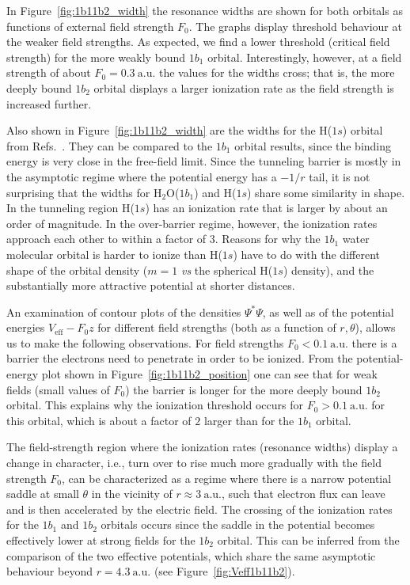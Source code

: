 In Figure~\ref{fig:1b11b2_width} the resonance widths are shown for
both orbitals as functions of external field strength $F_{0}$. The
graphs display threshold behaviour at the weaker field strengths. As
expected, we find a lower threshold (critical field strength) for the
more weakly bound $1b_{1}$ orbital. Interestingly, however, at a field
strength of about $F_{0} = 0.3\ \mathrm{a.u.}$ the values for the
widths cross; that is, the more deeply bound $1b_{2}$ orbital displays
a larger ionization rate as the field strength is increased further.

Also shown in Figure~\ref{fig:1b11b2_width} are the widths for the
H($1s$) orbital from Refs.~\cite{Telnov_1989,Kolosov_1987}. They can
be compared to the $1b_{1}$ orbital results, since the binding energy
is very close in the free-field limit. Since the tunneling barrier is
mostly in the asymptotic regime where the potential energy has a
$-1/r$ tail, it is not surprising that the widths for
H$_{2}$O($1b_{1}$) and H($1s$) share some similarity in shape. In the
tunneling region H($1s$) has an ionization rate that is larger by
about an order of magnitude. In the over-barrier regime, however, the
ionization rates approach each other to within a factor of 3. Reasons
for why the $1b_1$ water molecular orbital is harder to ionize than
H($1s$) have to do with the different shape of the orbital density
($m=1$ \emph{vs} the spherical H($1s$) density), and the substantially
more attractive potential at shorter distances.

An examination of contour plots of the densities $\Psi^{*}\Psi$, as
well as of the potential energies $V_{\mathrm{eff}} - F_{0}z$ for
different field strengths (both as a function of $r,\theta$), allows
us to make the following observations. For field strengths $F_{0} <
0.1\ \mathrm{a.u.}$ there is a barrier the electrons need to penetrate
in order to be ionized. From the potential-energy plot shown in
Figure~\ref{fig:1b11b2_position} one can see that for weak fields
(small values of $F_{0}$) the barrier is longer for the more deeply
bound $1b_{2}$ orbital. This explains why the ionization threshold
occurs for $F_{0} > 0.1\ \mathrm{a.u.}$ for this orbital, which is
about a factor of $2$ larger than for the $1b_{1}$ orbital.

The field-strength region where the ionization rates (resonance
widths) display a change in character, i.e., turn over to rise much
more gradually with the field strength $F_{0}$, can be characterized
as a regime where there is a narrow potential saddle at small $\theta$
in the vicinity of $r \approx 3\ \mathrm{a.u.}$, such that electron
flux can leave and is then accelerated by the electric field. The
crossing of the ionization rates for the $1b_{1}$ and $1b_{2}$
orbitals occurs since the saddle in the potential becomes effectively
lower at strong fields for the $1b_{2}$ orbital. This can be inferred
from the comparison of the two effective potentials, which share the
same asymptotic behaviour beyond $r = 4.3\ \mathrm{a.u.}$ (see
Figure~\ref{fig:Veff1b11b2}).

